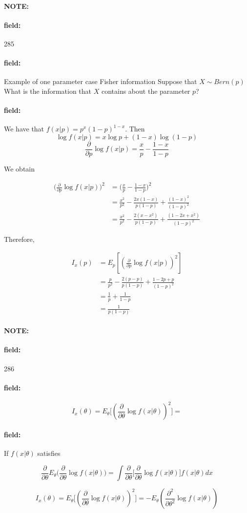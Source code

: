 \documentclass[12pt]{article}
\newenvironment{note}{\paragraph{NOTE:}}{}
\newenvironment{field}{\paragraph{field:}}{}
\begin{document}
\begin{note} \begin{field} \tiny 285 \end{field}
  \begin{field}
    Example of one parameter case Fisher information
    Suppose that $X \sim Bern(p)$ What is the information that $X$ contains about the parameter $p$?
  \end{field}
  \begin{field}
    We have that $f(x|p) = p^x(1-p)^{1-x}$. Then $$ \log f(x|p) = x \log p + (1-x)\log(1-p)$$
    $$ \frac{\partial}{\partial p} \log f(x|p) = \frac{x}{p} - \frac{1-x}{1-p}$$

    We obtain


    \begin{align*}
      \big(\frac{\partial}{\partial p} \log f(x|p) \big)^2 &= \big(\frac{x}{p} - \frac{1-x}{1-p}\big)^2\\
      &= \frac{x^2}{p^2} - \frac{2x(1-x)}{p(1-p)} + \frac{(1-x)^2}{(1-p)^2}\\
      &= \frac{x^2}{p^2} - \frac{2(x-x^2)}{p(1-p)} + \frac{(1-2x+x^2)}{(1-p)^2}
    \end{align*}

    Therefore,

    \begin{align*}
      I_x(p) &= E_p[(\frac{\partial}{\partial p} \log f(x|p))^2]\\
      &= \frac{p}{p^2} - \frac{2(p-p)}{p(1-p)} + \frac{1 - 2p + p}{(1-p)^2}\\
      &= \frac{1}{p} + \frac{1}{1-p}\\
      &= \frac{1}{p(1-p)}
    \end{align*}
  \end{field}
\end{note}





\begin{note} \begin{field} \tiny 286 \end{field}
  \begin{field}
    $$ I_x(\theta) = E_\theta\big[(\frac{\partial}{\partial \theta} \log f(x|\theta))^2\big] = $$

  \end{field}
  \begin{field}
    If $f(x|\theta)$ satisfies

    $$ \frac{\partial}{\partial \theta} E_\theta \big( \frac{\partial}{\partial \theta} \log f(x|\theta)\big) = \int \frac{\partial}{\partial \theta}\big[\frac{\partial}{\partial \theta}\log f(x|\theta)\big]f(x|\theta)dx $$

    $$ I_x(\theta) = E_\theta\big[(\frac{\partial}{\partial \theta} \log f(x|\theta))^2\big] = - E_\theta (\frac{\partial^2}{\partial \theta^2} \log f(x|\theta))$$
  \end{field}
\end{note}
\end{document}
